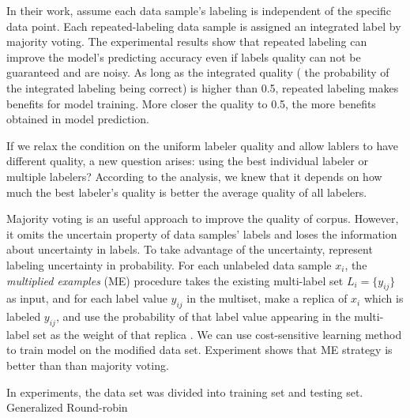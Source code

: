 \documentclass[11pt]{article}
\begin{document}
In their work,  assume each data sample's labeling is independent of the specific data point. Each repeated-labeling data sample is assigned an integrated label by majority voting. The experimental results show that repeated labeling can improve the model's predicting accuracy even if labels quality can not be guaranteed and are noisy.  As long as the integrated quality ( the probability of the integrated labeling being correct) is higher than 0.5, repeated labeling makes benefits for model training. More closer the quality to 0.5, the more benefits obtained in model prediction.

If we relax the condition on the uniform labeler quality and allow lablers to have different quality,  a new question arises: using the best individual labeler or multiple labelers? According to the analysis, we knew that it depends on how much the best labeler's quality is better the average quality of all labelers.

Majority voting is an useful approach to improve the quality of corpus. However, it omits  the uncertain property of data samples' labels and loses the information about uncertainty in labels. To take advantage of the uncertainty,  represent labeling uncertainty in probability. For each unlabeled data sample $x_{i}$, the \textit{multiplied examples} (ME) procedure takes the existing multi-label set  $L_i = \{y_{ij}\}$ as input, and for each label value $y_{ij} $ in the multiset, make a replica of $x_i$ which is labeled $y_{ij}$, and use the probability of that label value appearing in the multi-label set as the weight of that replica . We can use cost-sensitive learning method to train model on the modified data set. Experiment shows that ME strategy is better than than majority voting.

In experiments, the data set was divided into training set and testing set. Generalized Round-robin   


\end{document}
